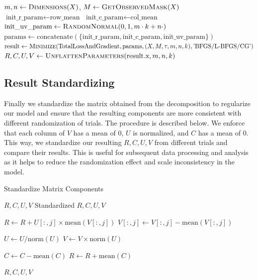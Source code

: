 \documentclass{article}
\begin{document}
\begin{algorithm}[ht]
\begin{algorithmic}[1]
    \State $m, n \gets \Call{Dimensions}{X}$, $M \gets \Call{GetObservedMask}{X}$
    \State $\text{init\_r\_param} \gets \text{row\_mean}$
    \State $\text{init\_c\_param} \gets \text{col\_mean}$
    \State $\text{init\_uv\_param} \gets \Call{RandomNormal}{0, 1, m \cdot k + n \cdot}$
    \State $\text{params} \gets \text{concatenate}(\{\text{init\_r\_param}, \text{init\_c\_param}, \text{init\_uv\_param}\})$
    \State $\text{result} \gets \Call{Minimize}{\text{TotalLossAndGradient}, \text{params}, (X, M, \tau, m, n, k), \text{'BFGS/L-BFGS/CG'}}$
    \State \Return $R, C, U, V \gets \Call{UnflattenParameters}{\text{result.x}, m, n, k}$
\EndFunction
\end{algorithmic}
\end{algorithm}
\FloatBarrier

\subsection{Result Standardizing}
Finally we standardize the matrix obtained from the decomposition to regularize our model and ensure that the resulting components are more consistent with different randomization of trials. The procedure is described below. We enforce that each column of $V$ has a mean of 0, $U$ is normalized, and $C$ has a mean of 0. This way, we standardize our resulting $R,C,U,V$ from different trials and compare their results. This is useful for subsequent data processing and analysis as it helps to reduce the randomization effect and scale inconsistency in the model.

\begin{algorithm}[ht]
\caption{Standardize Matrix Components}
\begin{algorithmic}[1]
\Require $R, C, U, V$
\Ensure Standardized $R, C, U, V$

    \State $R \gets R + U[:, j] \times \text{mean}(V[:, j])$
    \State $V[:, j] \gets V[:, j] - \text{mean}(V[:, j])$
\EndFor

\State $U \gets U / \text{norm}(U)$
\State $V \gets V \times \text{norm}(U)$

\State $C \gets C - \text{mean}(C)$
\State $R \gets R + \text{mean}(C)$

\State \Return $R, C, U, V$
\end{algorithmic}
\end{algorithm}
\FloatBarrier
\end{document}
